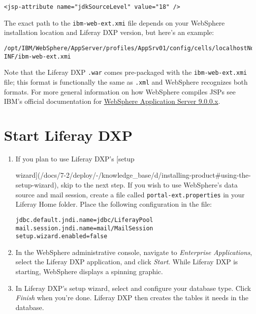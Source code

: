 \begin{verbatim}
<jsp-attribute name="jdkSourceLevel" value="18" />
\end{verbatim}

The exact path to the \texttt{ibm-web-ext.xmi} file depends on your
WebSphere installation location and Liferay DXP version, but here's an
example:

\begin{verbatim}
/opt/IBM/WebSphere/AppServer/profiles/AppSrv01/config/cells/localhostNode01Cell/applications/liferayXX.ear/deployments/liferayXX/liferayXX.war/WEB-INF/ibm-web-ext.xmi
\end{verbatim}

Note that the Liferay DXP \texttt{.war} comes pre-packaged with the
\texttt{ibm-web-ext.xmi} file; this format is functionally the same as
\texttt{.xml} and WebSphere recognizes both formats. For more general
information on how WebSphere compiles JSPs see IBM's official
documentation for
\href{https://www.ibm.com/support/knowledgecenter/en/SSEQTP_9.0.0/com.ibm.websphere.base.doc/ae/rweb_jspengine.html}{WebSphere
Application Server 9.0.0.x}.

\section{Start Liferay DXP}\label{start-liferay-dxp}

\begin{enumerate}
\def\labelenumi{\arabic{enumi}.}
\item
  If you plan to use Liferay DXP's {[}setup

  wizard{]}(/docs/7-2/deploy/-/knowledge\_base/d/installing-product\#using-the-setup-wizard),
  skip to the next step. If you wish to use WebSphere's data source and
  mail session, create a file called \texttt{portal-ext.properties} in
  your Liferay Home folder. Place the following configuration in the
  file:

\begin{verbatim}
jdbc.default.jndi.name=jdbc/LiferayPool
mail.session.jndi.name=mail/MailSession
setup.wizard.enabled=false
\end{verbatim}
\item
  In the WebSphere administrative console, navigate to \emph{Enterprise
  Applications}, select the Liferay DXP application, and click
  \emph{Start}. While Liferay DXP is starting, WebSphere displays a
  spinning graphic.
\item
  In Liferay DXP's setup wizard, select and configure your database
  type. Click \emph{Finish} when you're done. Liferay DXP then creates
  the tables it needs in the database.
\end{enumerate}

